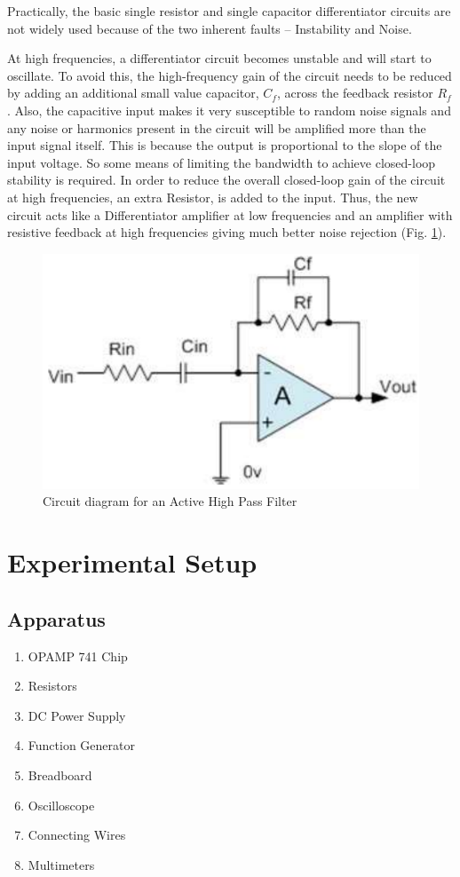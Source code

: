 Practically, the basic single resistor and single capacitor differentiator circuits are not widely used because of the two inherent faults -- Instability and Noise.

At high frequencies, a differentiator circuit becomes unstable and will start to oscillate. To avoid this, the high-frequency gain of the circuit needs to be reduced by adding an additional small value capacitor, $C_f$, across the feedback resistor $R_f$. Also, the capacitive input makes it very susceptible to random noise signals and any noise or harmonics present in the circuit will be amplified more than the input signal itself. This is because the output is proportional to the slope of the input voltage. So some means of limiting the bandwidth to achieve closed-loop stability is required. In order to reduce the overall closed-loop gain of the circuit at high frequencies, an extra Resistor,  is added to the input. Thus, the new circuit acts like a Differentiator amplifier at low frequencies and an amplifier with resistive feedback at high frequencies giving much better noise rejection (Fig. \ref{highpasscircuit}).

\begin{figure}[H]
    \centering
    \includegraphics[width=0.7\columnwidth]{images/highpass.png}
    \caption{Circuit diagram for an Active High Pass Filter}
    \label{highpasscircuit}
\end{figure}

\section{Experimental Setup}

\subsection*{Apparatus}

\begin{enumerate}
    \item OPAMP 741 Chip
    \item Resistors
    \item DC Power Supply
    \item Function Generator
    \item Breadboard
    \item Oscilloscope
    \item Connecting Wires
    \item Multimeters
\end{enumerate}

